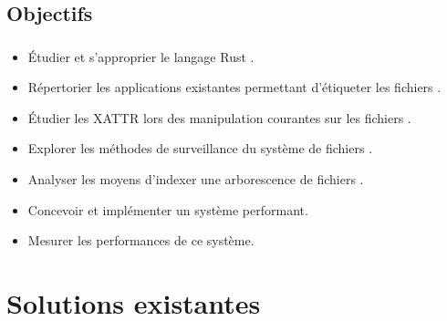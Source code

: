 \documentclass[10pt]{beamer}
\begin{document}
\subsection{Objectifs}
\begin{frame}
    \frametitle{\subsecname}
    \begin{itemize}
        \item Étudier et s'approprier le langage Rust \cite{ref0}.
        \pause
        \item Répertorier les applications existantes permettant d'étiqueter les fichiers \cite{ref5} 
            \cite{ref6} \cite{ref7} \cite{ref8} \cite{ref9} \cite{ref10} \cite{ref15} \cite{ref16} \cite{ref14}.
        \pause
        \item Étudier les XATTR lors des manipulation courantes sur les fichiers \cite{ref3} \cite{ref4} \cite{ref11}.
        \pause
        \item Explorer les méthodes de surveillance du système de fichiers \cite{ref12} \cite{ref29} 
            \cite{ref30} \cite{ref31} \cite{ref32}.
        \pause
        \item Analyser les moyens d'indexer une arborescence de fichiers \cite{ref25} \cite{ref26} \cite{ref28}.
        \pause
        \item Concevoir et implémenter un système performant.
        \pause
        \item Mesurer les performances de ce système.
    \end{itemize}
\end{frame}

\section{Solutions existantes}
\end{document}
